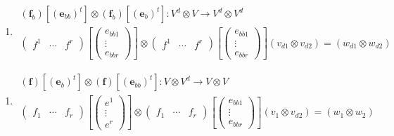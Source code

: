 \documentclass[aps,preprint]{revtex4}
\begin{document}
\begin{enumerate}
\begin{enumerate}
\item 
\begin{gather}
\left( \boldsymbol{f}_{b}\right) \left[ \left( \mathbf{e}_{bb}\right) ^{t}%
\right] \otimes \left( \boldsymbol{f}_{b}\right) \left[ \left( \mathbf{e}%
_{b}\right) ^{t}\right] :V^{d}\otimes V\rightarrow V^{d}\otimes V^{d} \\
\left( 
\begin{array}{ccc}
f^{1} & \cdots & f^{r}%
\end{array}%
\right) \left[ \left( 
\begin{array}{c}
e_{bb1} \\ 
\vdots \\ 
e_{bbr}%
\end{array}%
\right) \right] \otimes \left( 
\begin{array}{ccc}
f^{1} & \cdots & f^{r}%
\end{array}%
\right) \left[ \left( 
\begin{array}{c}
e_{bb1} \\ 
\vdots \\ 
e_{bbr}%
\end{array}%
\right) \right] \left( v_{d1}\otimes v_{d2}\right) =\left( w_{d1}\otimes
w_{d2}\right)
\end{gather}
\end{enumerate}

\begin{enumerate}
\item 
\begin{gather}
\left( \boldsymbol{f}\right) \left[ \left( \mathbf{e}_{b}\right) ^{t}\right]
\otimes \left( \boldsymbol{f}\right) \left[ \left( \mathbf{e}_{bb}\right)
^{t}\right] :V\otimes V^{d}\rightarrow V\otimes V \\
\left( 
\begin{array}{ccc}
f_{1} & \cdots & f_{r}%
\end{array}%
\right) \left[ \left( 
\begin{array}{c}
e^{1} \\ 
\vdots \\ 
e^{r}%
\end{array}%
\right) \right] \otimes \left( 
\begin{array}{ccc}
f_{1} & \cdots & f_{r}%
\end{array}%
\right) \left[ \left( 
\begin{array}{c}
e_{bb1} \\ 
\vdots \\ 
e_{bbr}%
\end{array}%
\right) \right] \left( v_{1}\otimes v_{d2}\right) =\left( w_{1}\otimes
w_{2}\right)
\end{gather}


\end{enumerate}
\end{enumerate}
\end{document}
